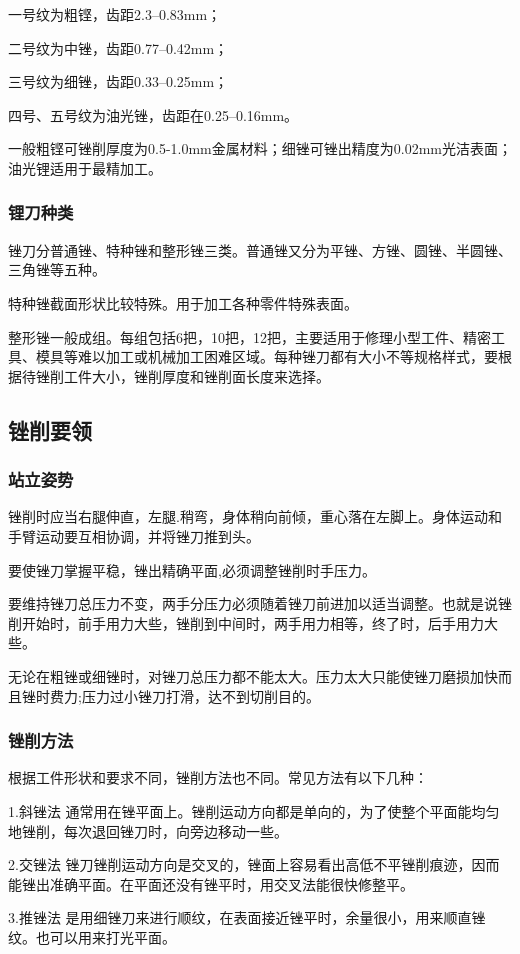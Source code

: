 \documentclass{ctexbook}
\begin{document}
一号纹为粗铿，齿距2.3--0.83mm；

二号纹为中锉，齿距0.77--0.42mm；

三号纹为细锉，齿距0.33--0.25mm；

四号、五号纹为油光锉，齿距在0.25--0.16mm。

一般粗铿可锉削厚度为0.5-1.0mm金属材料；细锉可锉出精度为0.02mm光洁表面；油光锂适用于最精加工。
\subsubsection{锂刀种类}
锉刀分普通锉、特种锉和整形锉三类。普通锉又分为平锉、方锉、圆锉、半圆锉、三角锉等五种。

特种锉截面形状比较特殊。用于加工各种零件特殊表面。

整形锉一般成组。每组包括6把，10把，12把，主要适用于修理小型工件、精密工具、模具等难以加工或机械加工困难区域。每种锉刀都有大小不等规格样式，要根据待锉削工件大小，锉削厚度和锉削面长度来选择。
\subsection{锉削要领}
\subsubsection{站立姿势}
锉削时应当右腿伸直，左腿.稍弯，身体稍向前倾，重心落在左脚上。身体运动和手臂运动要互相协调，并将锉刀推到头。

要使锉刀掌握平稳，锉出精确平面,必须调整锉削时手压力。

要维持锉刀总压力不变，两手分压力必须随着锉刀前进加以适当调整。也就是说锉削开始时，前手用力大些，锉削到中间时，两手用力相等，终了时，后手用力大些。

无论在粗锉或细锉时，对锉刀总压力都不能太大。压力太大只能使锉刀磨损加快而且锉时费力;压力过小锉刀打滑，达不到切削目的。
\subsubsection{锉削方法}
根据工件形状和要求不同，锉削方法也不同。常见方法有以下几种：

1.斜锉法 通常用在锉平面上。锉削运动方向都是单向的，为了使整个平面能均匀地锉削，每次退回锉刀时，向旁边移动一些。

2.交锉法 锉刀锉削运动方向是交叉的，锉面上容易看出高低不平锉削痕迹，因而能锉出准确平面。在平面还没有锉平时，用交叉法能很快修整平。

3.推锉法 是用细锉刀来进行顺纹，在表面接近锉平时，余量很小，用来顺直锉纹。也可以用来打光平面。
\end{document}
